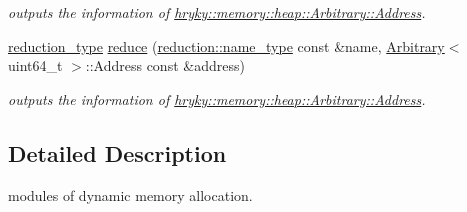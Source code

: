 \begin{DoxyCompactItemize}
\begin{DoxyCompactList}\small\item\em outputs the information of \hyperlink{structhryky_1_1memory_1_1heap_1_1_arbitrary_1_1_address}{hryky\-::memory\-::heap\-::\-Arbitrary\-::\-Address}. \end{DoxyCompactList}\item 
\hypertarget{namespacehryky_1_1memory_1_1heap_afeb2dd0bfeaf9e1ec2a81916a4e03066}{\hyperlink{namespacehryky_a343a9a4c36a586be5c2693156200eadc}{reduction\-\_\-type} \hyperlink{namespacehryky_1_1memory_1_1heap_afeb2dd0bfeaf9e1ec2a81916a4e03066}{reduce} (\hyperlink{namespacehryky_1_1reduction_ac686c30a4c8d196bbd0f05629a6b921f}{reduction\-::name\-\_\-type} const \&name, \hyperlink{classhryky_1_1memory_1_1heap_1_1_arbitrary}{Arbitrary}$<$ uint64\-\_\-t $>$\-::Address const \&address)}\label{namespacehryky_1_1memory_1_1heap_afeb2dd0bfeaf9e1ec2a81916a4e03066}

\begin{DoxyCompactList}\small\item\em outputs the information of \hyperlink{structhryky_1_1memory_1_1heap_1_1_arbitrary_1_1_address}{hryky\-::memory\-::heap\-::\-Arbitrary\-::\-Address}. \end{DoxyCompactList}\end{DoxyCompactItemize}


\subsection{Detailed Description}
modules of dynamic memory allocation. 